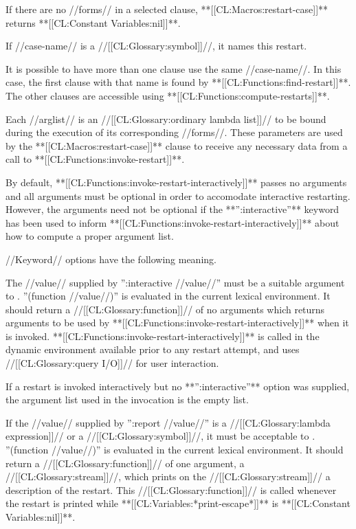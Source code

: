 If there are no //forms// in a selected clause, **[[CL:Macros:restart-case]]** returns **[[CL:Constant Variables:nil]]**.

If //case-name// is a //[[CL:Glossary:symbol]]//, it names this restart.

It is possible to have more than one clause use the same //case-name//. In this case, the first clause with that name is found by **[[CL:Functions:find-restart]]**. The other clauses are accessible using **[[CL:Functions:compute-restarts]]**.

Each //arglist// is an //[[CL:Glossary:ordinary lambda list]]// to be bound during the execution of its corresponding //forms//. These parameters are used by the **[[CL:Macros:restart-case]]** clause to receive any necessary data from a call to **[[CL:Functions:invoke-restart]]**.

By default, **[[CL:Functions:invoke-restart-interactively]]** passes no arguments and all arguments must be optional in order to accomodate interactive restarting. However, the arguments need not be optional if the **'':interactive''** keyword has been used to inform **[[CL:Functions:invoke-restart-interactively]]** about how to compute a proper argument list.

//Keyword// options have the following meaning. \beginlist {}

The //value// supplied by '':interactive //value//'' must be a suitable argument to . ''(function //value//)'' is evaluated in the current lexical environment. It should return a //[[CL:Glossary:function]]// of no arguments which returns arguments to be used by **[[CL:Functions:invoke-restart-interactively]]** when it is invoked. **[[CL:Functions:invoke-restart-interactively]]** is called in the dynamic environment available prior to any restart attempt, and uses //[[CL:Glossary:query I/O]]// for user interaction.

If a restart is invoked interactively but no **'':interactive''** option was supplied, the argument list used in the invocation is the empty list.


If the //value// supplied by '':report //value//'' is a //[[CL:Glossary:lambda expression]]// or a //[[CL:Glossary:symbol]]//, it must be acceptable to . ''(function //value//)'' is evaluated in the current lexical environment. It should return a //[[CL:Glossary:function]]// of one argument, a //[[CL:Glossary:stream]]//, which prints on the //[[CL:Glossary:stream]]// a description of the restart. This //[[CL:Glossary:function]]// is called whenever the restart is printed while **[[CL:Variables:*print-escape*]]** is **[[CL:Constant Variables:nil]]**.

